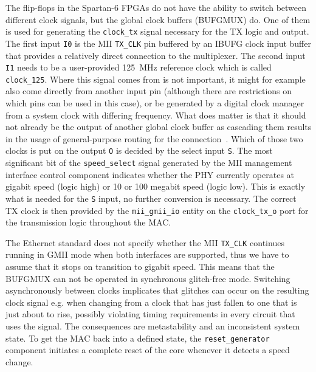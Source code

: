 \documentclass[a4paper, 11pt, oneside]{Thesis}  %
\begin{document}
The flip-flops in the Spartan-6 FPGAs do not have the ability to switch between different clock signals, but the global clock buffers (BUFGMUX) do. One of them is used for generating the \texttt{clock\_tx} signal necessary for the TX logic and output. The first input \texttt{I0} is the MII \texttt{TX\_CLK} pin buffered by an IBUFG clock input buffer that provides a relatively direct connection to the multiplexer. The second input \texttt{I1} needs to be a user-provided 125~MHz reference clock which is called \texttt{clock\_125}. Where this signal comes from is not important, it might for example also come directly from another input pin (although there are restrictions on which pins can be used in this case), or be generated by a digital clock manager from a system clock with differing frequency. What does matter is that it should not already be the output of another global clock buffer as cascading them results in the usage of general-purpose routing for the connection~\cite{S6Clocking}. Which of those two clocks is put on the output \texttt{O} is decided by the select input \texttt{S}. The most significant bit of the \texttt{speed\_select} signal generated by the MII management interface control component indicates whether the PHY currently operates at gigabit speed (logic high) or 10 or 100 megabit speed (logic low). This is exactly what is needed for the \texttt{S} input, no further conversion is necessary. The correct TX clock is then provided by the \texttt{mii\_gmii\_io} entity on the \texttt{clock\_tx\_o} port for the transmission logic throughout the MAC.

The Ethernet standard does not specify whether the MII \texttt{TX\_CLK} continues running in GMII mode when both interfaces are supported, thus we have to assume that it stops on transition to gigabit speed. This means that the BUFGMUX can not be operated in synchronous glitch-free mode. Switching asynchronously between clocks implicates that glitches can occur on the resulting clock signal e.g. when changing from a clock that has just fallen to one that is just about to rise, possibly violating timing requirements in every circuit that uses the signal. The consequences are metastability and an inconsistent system state. To get the MAC back into a defined state, the \texttt{reset\_generator} component initiates a complete reset of the core whenever it detects a speed change.
\end{document}
